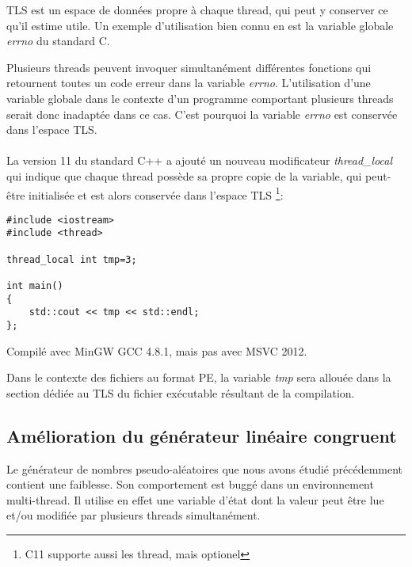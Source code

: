 ﻿
\label{TLS}

TLS est un espace de données propre à chaque thread, qui peut y conserver ce qu'il estime utile.
Un exemple d'utilisation bien connu en est la variable globale \emph{errno} du standard C.

Plusieurs threads peuvent invoquer simultanément différentes fonctions qui retournent toutes un code 
erreur dans la variable \emph{errno}. L'utilisation d'une variable globale dans le contexte d'un 
programme comportant plusieurs threads serait donc inadaptée dans ce cas. C'est pourquoi la variable 
\emph{errno} est conservée dans l'espace \ac{TLS}.\\
\\
La version 11 du standard C++ a ajouté un nouveau modificateur \emph{thread\_local} qui indique que 
chaque thread possède sa propre copie de la variable, qui peut-être initialisée et est
alors conservée dans l'espace \ac{TLS}
\footnote{ C11 supporte aussi les thread, mais optionel}:

\begin{lstlisting}[caption=C++11,style=customc]
#include <iostream>
#include <thread>

thread_local int tmp=3;

int main()
{
	std::cout << tmp << std::endl;
};
\end{lstlisting}

Compilé avec MinGW GCC 4.8.1, mais pas avec MSVC 2012.

Dans le contexte des fichiers au format PE, la variable \emph{tmp} sera allouée dans la section dédiée 
au \ac{TLS} du fichier exécutable résultant de la compilation.

\subsection{Amélioration du générateur linéaire congruent}
\label{LCG_TLS}

Le générateur de nombres pseudo-aléatoires  que nous avons étudié précédemment 
contient une faiblesse. Son comportement est buggé dans un environnement multi-thread. Il utilise 
en effet une variable d'état dont la valeur peut être lue et/ou modifiée par plusieurs threads 
simultanément.





